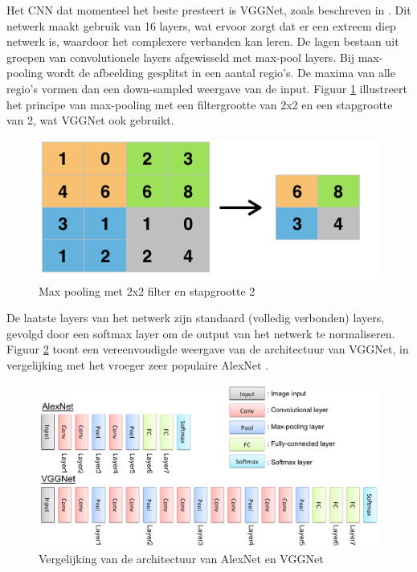 Het CNN dat momenteel het beste presteert is VGGNet, zoals beschreven in . Dit netwerk maakt gebruik van 16 layers, wat ervoor zorgt dat er een extreem diep netwerk is, waardoor het complexere verbanden kan leren. De lagen bestaan uit groepen van convolutionele layers afgewisseld met max-pool layers. Bij max-pooling wordt de afbeelding gesplitst in een aantal regio's. De maxima van alle regio's vormen dan een down-sampled weergave van de input. Figuur \ref{fig:maxpool}  illustreert het principe van max-pooling met een filtergrootte van 2x2 en een stapgrootte van 2, wat VGGNet ook gebruikt.

\begin{figure}[tb]
    \centering
    \includegraphics[width=0.6\linewidth]{Images/maxpool.png}
    \caption{Max pooling met 2x2 filter en stapgrootte 2}
    \label{fig:maxpool}
\end{figure}

De laatste layers van het netwerk zijn standaard (volledig verbonden) layers, gevolgd door een softmax layer om de output van het netwerk te normaliseren. Figuur \ref{fig:alexvgg} toont een vereenvoudigde weergave van de architectuur van VGGNet, in vergelijking met het vroeger zeer populaire AlexNet .

\begin{figure}[tb]
    \centering
    \includegraphics[width=\linewidth]{Images/alex_vgg.eps}
    \caption{Vergelijking van de architectuur van AlexNet en VGGNet}
    \label{fig:alexvgg}
\end{figure}


